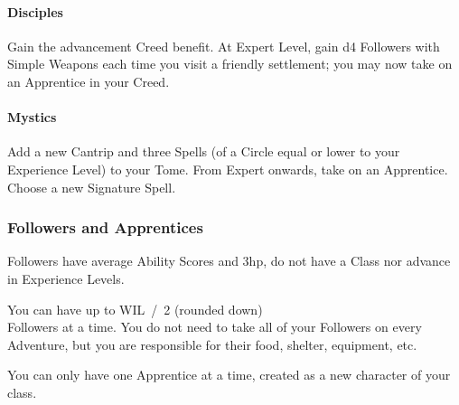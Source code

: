 \documentclass[itdr]{subfiles}
\begin{document}
\paragraph{Disciples}
Gain the advancement Creed benefit. At Expert Level, gain d4 Followers with Simple Weapons each time you visit a friendly settlement; you may now take on an Apprentice in your Creed.

\paragraph{Mystics} Add a new Cantrip and three Spells (of a Circle equal or lower to your Experience Level) to your Tome. From Expert onwards, take on an Apprentice. Choose a new Signature Spell.

\subsubsection{Followers and Apprentices}
Followers have average Ability Scores and 3hp, do not have a Class nor advance in Experience Levels.

You can have up to WIL~/~2 (rounded down)\\Followers at a time. You do not need to take all of your Followers on every Adventure, but you are responsible for their food, shelter, equipment, etc.

You can only have one Apprentice at a time, created as a new character of your class.
\end{document}

